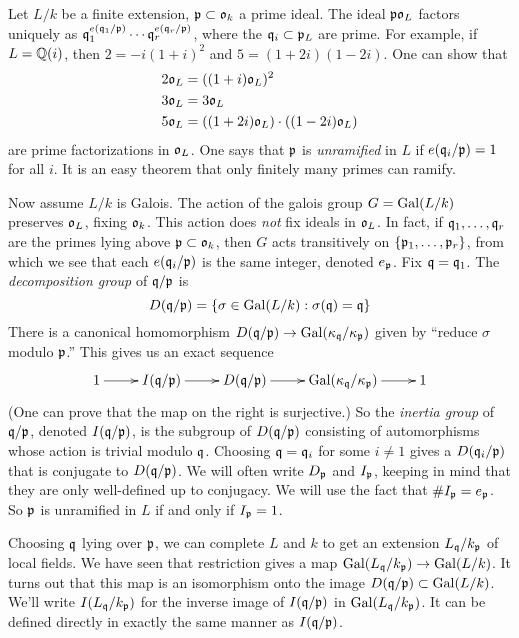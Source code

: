 \documentclass{article}
\begin{document}
Let $L/k$ be a finite extension, $\mathfrak{p}\subset \mathfrak{o}_k$ a prime ideal. The ideal 
$\mathfrak{p}\mathfrak{o}_L$ factors uniquely as 
$\mathfrak{q}_1^{e(\mathfrak{q}_1/\mathfrak{p})}\dotsm\mathfrak{q}_r^{e(\mathfrak{q}_r/\mathfrak{p})}$, where the $\mathfrak{q}_i\subset\mathfrak{p}_L$ 
are prime. For example, if $L=\mathbb{Q}(i)$, then $2=-i(1+i)^2$ and $5=(1+2i)(1-2i)$. 
One can show that 
\begin{align*}
  2\mathfrak{o}_L &= ((1+i)\mathfrak{o}_L)^2 \\
  3\mathfrak{o}_L &= 3\mathfrak{o}_L \\
  5\mathfrak{o}_L &= ((1+2i)\mathfrak{o}_L)\cdot ((1-2i)\mathfrak{o}_L)
\end{align*}
are prime factorizations in $\mathfrak{o}_L$. One says that $\mathfrak{p}$ is \emph{unramified} 
in $L$ if $e(\mathfrak{q}_i/\mathfrak{p})=1$ for all $i$. It is an easy theorem that only 
finitely many primes can ramify. 

Now assume $L/k$ is Galois. The action of the galois group $G=\operatorname{Gal}(L/k)$ 
preserves $\mathfrak{o}_L$, fixing $\mathfrak{o}_k$. This action does \emph{not} fix ideals in 
$\mathfrak{o}_L$. In fact, if $\mathfrak{q}_1,\dots,\mathfrak{q}_r$ are the primes lying above 
$\mathfrak{p}\subset \mathfrak{o}_k$, then $G$ acts transitively on $\{\mathfrak{p}_1,\dots,\mathfrak{p}_r\}$, 
from which we see that each $e(\mathfrak{q}_i/\mathfrak{p})$ is the same integer, denoted 
$e_{\mathfrak{p}}$. Fix $\mathfrak{q}=\mathfrak{q}_1$. The \emph{decomposition group} of $\mathfrak{q}/\mathfrak{p}$ is 
\[
  D(\mathfrak{q}/\mathfrak{p}) = \{\sigma\in \operatorname{Gal}(L/k) : \sigma(\mathfrak{q}) = \mathfrak{q}\}
\]
There is a canonical homomorphism 
$D(\mathfrak{q}/\mathfrak{p}) \to \operatorname{Gal}(\kappa_{\mathfrak{q}}/\kappa_{\mathfrak{p}})$ given by ``reduce $\sigma$ modulo 
$\mathfrak{p}$.'' This gives us an exact sequence 
\[\xymatrix{
  1 \ar[r] 
    & I(\fq/\fp) \ar[r] 
    & D(\fq/\fp) \ar[r] 
    & \gal(\kappa_\fq/\kappa_\fp) \ar[r] 
    & 1
}\]
(One can prove that the map on the right is surjective.) So the \emph{inertia 
group} of $\mathfrak{q}/\mathfrak{p}$, denoted $I(\mathfrak{q}/\mathfrak{p})$, is the subgroup of $D(\mathfrak{q}/\mathfrak{p})$ 
consisting of automorphisms whose action is trivial modulo $\mathfrak{q}$. Choosing 
$\mathfrak{q}=\mathfrak{q}_i$ for some $i\ne 1$ gives a $D(\mathfrak{q}_i/\mathfrak{p})$ that is conjugate to 
$D(\mathfrak{q}/\mathfrak{p})$. We will often write $D_{\mathfrak{p}}$ and $I_{\mathfrak{p}}$, keeping in mind that 
they are only well-defined up to conjugacy. We will use the fact that 
$\# I_{\mathfrak{p}} = e_{\mathfrak{p}}$. So $\mathfrak{p}$ is unramified in $L$ if and only if 
$I_{\mathfrak{p}} = 1$. 

Choosing $\mathfrak{q}$ lying over $\mathfrak{p}$, we can complete $L$ and $k$ to get an 
extension $L_{\mathfrak{q}}/k_{\mathfrak{p}}$ of local fields. We have seen that restriction 
gives a map $\operatorname{Gal}(L_{\mathfrak{q}}/k_{\mathfrak{p}}) \to \operatorname{Gal}(L/k)$. It turns out that this map is an 
isomorphism onto the image $D(\mathfrak{q}/\mathfrak{p})\subset \operatorname{Gal}(L/k)$. We'll write 
$I(L_{\mathfrak{q}}/k_{\mathfrak{p}})$ for the inverse image of $I(\mathfrak{q}/\mathfrak{p})$ in 
$\operatorname{Gal}(L_{\mathfrak{q}}/k_{\mathfrak{p}})$. It can be defined directly in exactly the same manner as 
$I(\mathfrak{q}/\mathfrak{p})$. 
\end{document}
